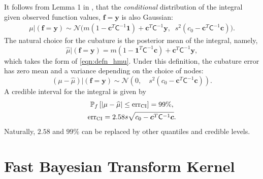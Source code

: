 \documentclass{svjour3}                     %
\newcommand{\bm}[1]{\boldsymbol{#1}}
\newcommand{\vc}{\bm{c}}
\newcommand{\vf}{\bm{f}}
\newcommand{\vy}{\bm{y}}
\newcommand{\vone}{\bm{1}}
\newcommand{\mC}{\mathsf{C}}
\newcommand{\calN}{\mathcal{N}}
\newcommand{\hmu}{\widehat{\mu}}
\newcommand{\CI}{\textup{CI}}
\newcommand{\err}{\textup{err}}
\begin{document}
It follows from Lemma 1 
in \cite{JagHic19a}, that the \emph{conditional} distribution of the integral given observed function values, $\vf = \vy$ is also Gaussian:
\begin{align} \label{eqn:condInteg}
\mu | (\vf = \vy) \sim \calN \bigl(m (1 - \vc^T \mC^{-1} \vone)  + \vc^T \mC^{-1} \vy, \;\;
s^2(c_0  -\vc ^T \mC^{-1} \vc) \bigr).
\end{align}
The natural choice for  the cubature is the posterior mean of the integral, namely, 
\begin{equation}
\label{eqn:BayesCub}
\widehat{\mu}  \vert ( \vf = \vy)
= m(1 - \vone^T  \mC^{-1}\vc )
+ \vc^T \mC^{-1} \vy,
\end{equation}
which takes the form of \eqref{eqn:defn_hmu}.
Under this definition, the cubature error has zero mean and a variance depending on the choice of nodes:
\begin{equation*}
(\mu-\hmu) | (\vf = \vy)
\sim  \calN 
\left(
0, \quad
s^2 (c_0 - \vc^T\mC^{-1}\vc) 
\right).
\end{equation*}
A credible interval for the integral is given by 
\begin{subequations} \label{eqn_prob_confidence_interval}
	\begin{gather}
	\mathbb{P}_f \left[
	|\mu-\hmu| \leq \err_{\CI}
	\right] = 99\%, \\
	\err_{\CI} = 2.58 s \sqrt{c_{0} - \vc^T\mC^{-1}\vc}.
	\end{gather}
\end{subequations}
Naturally, $2.58$ and $99\%$ can be replaced by other quantiles and credible levels.

























\section{Fast Bayesian Transform Kernel}
\label{sec:fast_BC}
\end{document}

